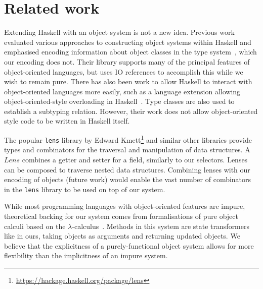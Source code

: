 

\section{Related work}
\label{sec:related}

Extending Haskell with an object system is not a new idea. Previous work evaluated various approaches to constructing object systems within Haskell and emphasised encoding information about object classes in the type system~\cite{kiselyov2005haskell}, which our encoding does not. Their library supports many of the principal features of object-oriented languages, but uses IO references to accomplish this while we wish to remain pure. There has also been work to allow Haskell to interact with object-oriented languages more easily, such as a language extension allowing object-oriented-style overloading in Haskell~\cite{shields2001object}. Type classes are also used to establish a subtyping relation. However, their work does not allow object-oriented style code to be written in Haskell itself.

The popular \texttt{lens} library by Edward Kmett\footnote{\url{https://hackage.haskell.org/package/lens}} and similar other libraries provide types and combinators for the traversal and manipulation of data structures. A $\mathit{Lens}$ combines a getter and setter for a field, similarly to our selectors. Lenses can be composed to traverse nested data structures.
Combining lenses with our encoding of objects (future work)
would enable the vast number of combinators in the \texttt{lens} library to be used on top of our system.

While most programming languages with object-oriented features are impure, theoretical backing for our system comes from formalisations of pure object calculi based on the $\lambda$-calculus~\citet{pierce1994simple}. Methods in this system are state transformers like in ours, taking objects as arguments and returning updated objects. We believe that the explicitness of a purely-functional object system allows for more flexibility than the implicitness of an impure system.


